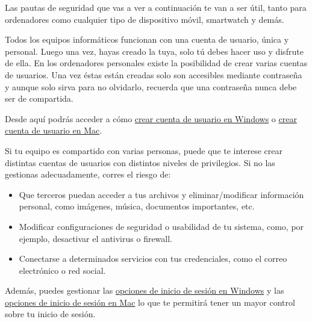 \documentclass[
  a4paper,
  openany]{book}
\begin{document}
Las pautas de seguridad que vas a ver a continuación te van a ser útil, tanto para ordenadores como cualquier tipo de dispositivo móvil, smartwatch y demás.

Todos los equipos informáticos funcionan con una cuenta de usuario, única y personal. Luego una vez, hayas creado la tuya, solo tú debes hacer uso y disfrute de ella. En los ordenadores personales existe la posibilidad de crear varias cuentas de usuarios. Una vez éstas están creadas solo son accesibles mediante contraseña y aunque solo sirva para no olvidarlo, recuerda que una contraseña nunca debe ser de compartida.

Desde aquí podrás acceder a cómo \href{https://support.microsoft.com/es-es/windows/crear-una-cuenta-de-administrador-o-de-usuario-local-en-windows-10-20de74e0-ac7f-3502-a866-32915af2a34d}{crear cuenta de usuario en Windows} o \href{https://support.apple.com/es-es/guide/mac-help/mtusr001/mac\#:~:text=A\%C3\%B1adir\%20un\%20usuario,en\%20\%E2\%80\%9CUsuarios\%20y\%20grupos\%E2\%80\%9D.\&text=Si\%20el\%20candado\%20situado\%20en,bajo\%20la\%20lista\%20de\%20usuarios}{crear cuenta de usuario en Mac}.

Si tu equipo es compartido con varias personas, puede que te interese crear distintas cuentas de usuarios con distintos niveles de privilegios. Si no las gestionas
adecuadamente, corres el riesgo de:

\begin{itemize}
\item
  Que terceros puedan acceder a tus archivos y eliminar/modificar información personal, como imágenes, música, documentos importantes, etc.
\item
  Modificar configuraciones de seguridad o usabilidad de tu sistema, como, por ejemplo, desactivar el antivirus o firewall.
\item
  Conectarse a determinados servicios con tus credenciales, como el correo electrónico o red social.
\end{itemize}

Además, puedes gestionar las \href{https://support.microsoft.com/es-es/windows/las-opciones-de-inicio-de-sesi\%C3\%B3n-de-windows-10-y-la-protecci\%C3\%B3n-de-la-cuenta-7b34d4cf-794f-f6bd-ddcc-e73cdf1a6fbf}{opciones de inicio de sesión en Windows} y las \href{https://support.apple.com/es-es/guide/mac-help/mtusr005/mac}{opciones de inicio de sesión en Mac} lo que te permitirá tener un mayor control sobre tu inicio de sesión.
\end{document}
